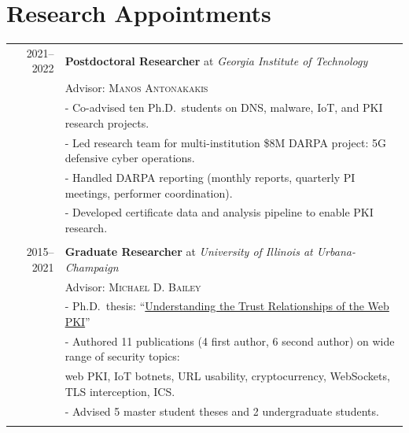 \documentclass[10pt,singlecolumn]{article} %
\begin{document}

\section{Research Appointments}

\begin{tabular}{rl}

2021--2022 & \textbf{Postdoctoral Researcher} at \emph{Georgia Institute of Technology}\\ 
& Advisor: \textsc{Manos Antonakakis} \\
& - Co-advised ten Ph.D.\ students on DNS, malware, IoT, and PKI research projects. \\
& - Led research team for multi-institution \$8M DARPA project: 5G defensive cyber operations. \\
& - Handled DARPA reporting (monthly reports, quarterly PI meetings, performer coordination). \\
& - Developed certificate data and analysis pipeline to enable PKI research. \\
\\

2015--2021 & \textbf{Graduate Researcher} at \emph{University of Illinois at Urbana-Champaign} \\ 
& Advisor: \textsc{Michael D. Bailey}\\
& - Ph.D.\ thesis: ``\href{https://zanema.com/papers/zane-dissertation.pdf}{Understanding the Trust Relationships of the Web PKI}''\\
& - Authored 11 publications (4 first author, 6 second author) on wide range of security topics: \\ 
&\quad web PKI, IoT botnets, URL usability, cryptocurrency, WebSockets, TLS interception, ICS. \\
& - Advised 5 master student theses and 2 undergraduate students. \\
\\

\end{tabular}\\


\end{document}
